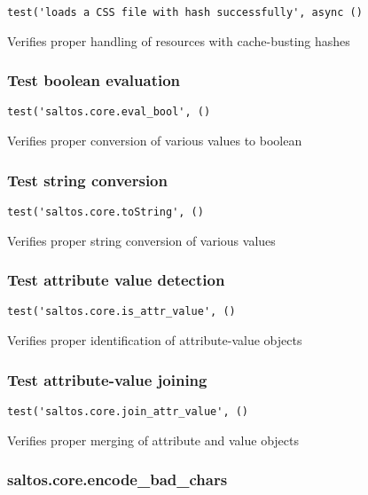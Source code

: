 \documentclass[a4paper]{article}
\begin{document}
\begin{lstlisting}
test('loads a CSS file with hash successfully', async ()
\end{lstlisting}

Verifies proper handling of resources with cache-busting hashes

\hypertarget{toc530}{}
\subsubsection{Test boolean evaluation}

\begin{lstlisting}
test('saltos.core.eval_bool', ()
\end{lstlisting}

Verifies proper conversion of various values to boolean

\hypertarget{toc531}{}
\subsubsection{Test string conversion}

\begin{lstlisting}
test('saltos.core.toString', ()
\end{lstlisting}

Verifies proper string conversion of various values

\hypertarget{toc532}{}
\subsubsection{Test attribute value detection}

\begin{lstlisting}
test('saltos.core.is_attr_value', ()
\end{lstlisting}

Verifies proper identification of attribute-value objects

\hypertarget{toc533}{}
\subsubsection{Test attribute-value joining}

\begin{lstlisting}
test('saltos.core.join_attr_value', ()
\end{lstlisting}

Verifies proper merging of attribute and value objects

\hypertarget{toc534}{}
\subsubsection{saltos.core.encode\_bad\_chars}
\end{document}
